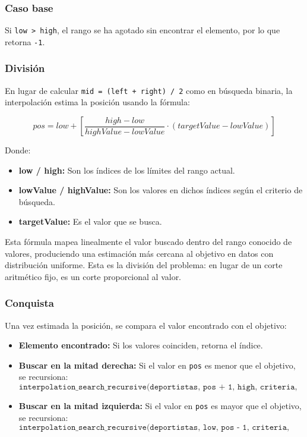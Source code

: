 \subsubsection{Caso base}
Si \texttt{low > high}, el rango se ha agotado sin encontrar el elemento, por lo que retorna \texttt{-1}.

\subsubsection{División}
En lugar de calcular \texttt{mid = (left + right) / 2} como en búsqueda binaria, la interpolación estima la posición usando la fórmula:

\begin{equation}
    pos = low + \left[ \frac{high - low}{highValue - lowValue} \cdot (targetValue - lowValue) \right]
\end{equation}

Donde:
\begin{itemize}
    \item \textbf{low / high:} Son los índices de los límites del rango actual.
    \item \textbf{lowValue / highValue:} Son los valores en dichos índices según el criterio de búsqueda.
    \item \textbf{targetValue:} Es el valor que se busca.
\end{itemize}

Esta fórmula mapea linealmente el valor buscado dentro del rango conocido de valores, produciendo una estimación más cercana al objetivo en datos con distribución uniforme. Esta es la división del problema: en lugar de un corte aritmético fijo, es un corte proporcional al valor.

\subsubsection{Conquista}
Una vez estimada la posición, se compara el valor encontrado con el objetivo:

\begin{itemize}
    \item \textbf{Elemento encontrado:} Si los valores coinciden, retorna el índice.
    
    \item \textbf{Buscar en la mitad derecha:} Si el valor en \texttt{pos} es menor que el objetivo, se recursiona:
    \[
    \texttt{interpolation\_search\_recursive(deportistas, pos + 1, high, criteria, targetValue)}
    \]
    
    \item \textbf{Buscar en la mitad izquierda:} Si el valor en \texttt{pos} es mayor que el objetivo, se recursiona:
    \[
    \texttt{interpolation\_search\_recursive(deportistas, low, pos - 1, criteria, targetValue)}
    \]
\end{itemize}

